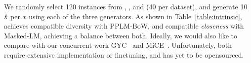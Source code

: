 We randomly select 120 instances from \qqp, \dnli, and \dsst (40 per dataset), and generate 10 $\hat{x}$ per $x$ using each of the three generators.
As shown in Table~\ref{table:intrinsic}, \sysname achieves compatible diversity with PPLM-BoW, and compatible \emph{closeness} with Masked-LM, achieving a balance between both.
Ideally, we would also like to compare \sysname with our concurrent work GYC~\cite{madaan2020generate} and MiCE~\cite{ross2020explaining}.
Unfortunately, both require extensive implementation or finetuning, and has yet to be opensourced.



